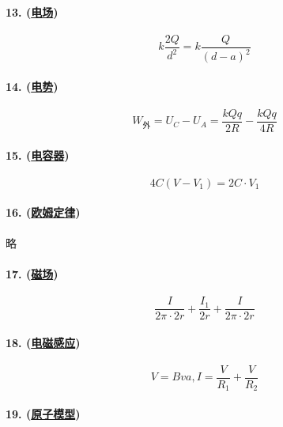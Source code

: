 \paragraph{13. (\hyperref[subsec:电场]{电场})}

\begin{equation*}
    k\frac{2Q}{d^2}=k\frac{Q}{(d-a)^2}
\end{equation*}

\paragraph{14. (\hyperref[subsec:电势]{电势})}

\begin{equation*}
    W_\text{外}=U_C-U_A=\frac{kQq}{2R}-\frac{kQq}{4R}
\end{equation*}

\paragraph{15. (\hyperref[subsec:电容器]{电容器})}

\begin{equation*}
    4C(V-V_1)=2C\cdot V_1
\end{equation*}

\paragraph{16. (\hyperref[subsec:欧姆定律]{欧姆定律})} 略

\paragraph{17. (\hyperref[subsec:磁场]{磁场})}

\begin{equation*}
    \frac{I}{2\pi\cdot2r}+\frac{I_1}{2r}+\frac{I}{2\pi\cdot2r}
\end{equation*}

\paragraph{18. (\hyperref[subsec:电磁感应]{电磁感应})}

\begin{equation*}
    V=Bva, I=\frac{V}{R_1}+\frac{V}{R_2}
\end{equation*}

\paragraph{19. (\hyperref[sec:原子模型]{原子模型})}

\begin{center}
\end{center}
